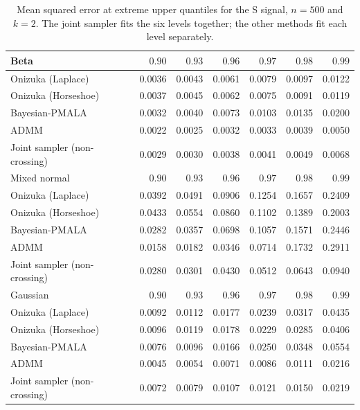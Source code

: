 \begin{table}[!htbp]
\centering
\small
\caption{Mean squared error at extreme upper quantiles for the S signal, $n=500$ and $k=2$. The joint sampler fits the six levels together; the other methods fit each level separately.}
\label{tab:s_ext_upper_mse}
\begin{tabular}{lrrrrrr}
\toprule
Beta & $0.90$ & $0.93$ & $0.96$ & $0.97$ & $0.98$ & $0.99$ \\
\midrule
Onizuka (Laplace) & 0.0036 & 0.0043 & 0.0061 & 0.0079 & 0.0097 & 0.0122 \\
Onizuka (Horseshoe) & 0.0037 & 0.0045 & 0.0062 & 0.0075 & 0.0091 & 0.0119 \\
Bayesian-PMALA & 0.0032 & 0.0040 & 0.0073 & 0.0103 & 0.0135 & 0.0200 \\
ADMM & 0.0022 & 0.0025 & 0.0032 & 0.0033 & 0.0039 & 0.0050 \\
Joint sampler (non-crossing) & 0.0029 & 0.0030 & 0.0038 & 0.0041 & 0.0049 & 0.0068 \\
\midrule
Mixed normal & $0.90$ & $0.93$ & $0.96$ & $0.97$ & $0.98$ & $0.99$ \\
\midrule
Onizuka (Laplace) & 0.0392 & 0.0491 & 0.0906 & 0.1254 & 0.1657 & 0.2409 \\
Onizuka (Horseshoe) & 0.0433 & 0.0554 & 0.0860 & 0.1102 & 0.1389 & 0.2003 \\
Bayesian-PMALA & 0.0282 & 0.0357 & 0.0698 & 0.1057 & 0.1571 & 0.2446 \\
ADMM & 0.0158 & 0.0182 & 0.0346 & 0.0714 & 0.1732 & 0.2911 \\
Joint sampler (non-crossing) & 0.0280 & 0.0301 & 0.0430 & 0.0512 & 0.0643 & 0.0940 \\
\midrule
Gaussian & $0.90$ & $0.93$ & $0.96$ & $0.97$ & $0.98$ & $0.99$ \\
\midrule
Onizuka (Laplace) & 0.0092 & 0.0112 & 0.0177 & 0.0239 & 0.0317 & 0.0435 \\
Onizuka (Horseshoe) & 0.0096 & 0.0119 & 0.0178 & 0.0229 & 0.0285 & 0.0406 \\
Bayesian-PMALA & 0.0076 & 0.0096 & 0.0166 & 0.0250 & 0.0348 & 0.0554 \\
ADMM & 0.0045 & 0.0054 & 0.0071 & 0.0086 & 0.0111 & 0.0216 \\
Joint sampler (non-crossing) & 0.0072 & 0.0079 & 0.0107 & 0.0121 & 0.0150 & 0.0219 \\
\bottomrule
\end{tabular}
\end{table}
